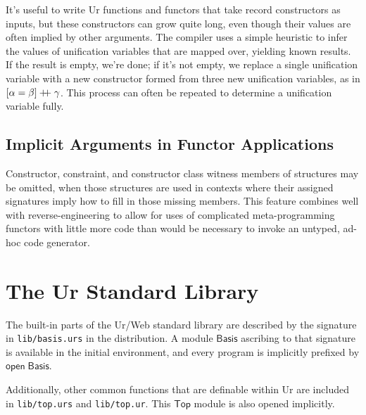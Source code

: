 \documentclass{article}
\newcommand{\mt}[1]{\mathsf{#1}}
\newcommand{\rc}{+ \hspace{-.075in} + \;}
\begin{document}
It's useful to write Ur functions and functors that take record constructors as inputs, but these constructors can grow quite long, even though their values are often implied by other arguments.  The compiler uses a simple heuristic to infer the values of unification variables that are mapped over, yielding known results.  If the result is empty, we're done; if it's not empty, we replace a single unification variable with a new constructor formed from three new unification variables, as in $[\alpha = \beta] \rc \gamma$.  This process can often be repeated to determine a unification variable fully.

\subsection{Implicit Arguments in Functor Applications}

Constructor, constraint, and constructor class witness members of structures may be omitted, when those structures are used in contexts where their assigned signatures imply how to fill in those missing members.  This feature combines well with reverse-engineering to allow for uses of complicated meta-programming functors with little more code than would be necessary to invoke an untyped, ad-hoc code generator.


\section{The Ur Standard Library}

The built-in parts of the Ur/Web standard library are described by the signature in \texttt{lib/basis.urs} in the distribution.  A module $\mt{Basis}$ ascribing to that signature is available in the initial environment, and every program is implicitly prefixed by $\mt{open} \; \mt{Basis}$.

Additionally, other common functions that are definable within Ur are included in \texttt{lib/top.urs} and \texttt{lib/top.ur}.  This $\mt{Top}$ module is also opened implicitly.
\end{document}
